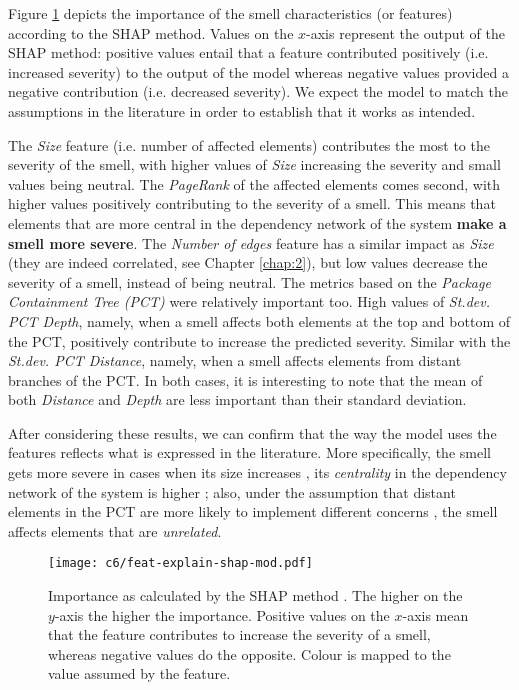 Figure \ref{c6:fig:feat-explain-shap} depicts the importance of the smell characteristics (or features) according to the SHAP method. Values on the $x$-axis represent the output of the SHAP method: positive values entail that a feature contributed positively (i.e. increased severity) to the output of the model whereas negative values provided a negative contribution (i.e. decreased severity).
We expect the model to match the assumptions in the literature in order to establish that it works as intended.

The \emph{Size} feature (i.e. number of affected elements) contributes the most to the severity of the smell, with higher values of \emph{Size} increasing the severity and small values being neutral.
The \emph{PageRank} of the affected elements comes second, with higher values positively contributing to the severity of a smell.
This means that elements that are more central in the dependency network of the system \textbf{make a smell more severe}.
The \emph{Number of edges} feature has a similar impact as \emph{Size} (they are indeed correlated, see Chapter \ref{chap:2}), but low values decrease the severity of a smell, instead of being neutral.
The metrics based on the \emph{Package Containment Tree (PCT)} \cite{Laval2012,AlMutawa2014} were relatively important too.
High values of \emph{St.dev. PCT Depth}, namely, when a smell affects both elements at the top and bottom of the PCT, positively contribute to increase the predicted severity.
Similar with the \emph{St.dev. PCT Distance}, namely, when a smell affects elements from distant branches of the PCT.
In both cases, it is interesting to note that the mean of both \emph{Distance} and \emph{Depth} are less important than their standard deviation.

After considering these results, we can confirm that the way the model uses the features reflects what is expressed in the literature.
More specifically, the smell gets more severe in cases when its size increases \cite{Lippert2006}, its \emph{centrality} in the dependency network of the system is higher \cite{Roveda2018}; also, under the assumption that distant elements in the PCT are more likely to implement different concerns \cite{Laval2012}, the smell affects elements that are  \emph{unrelated}.

\begin{figure}
    \centering
    \texttt{[image: c6/feat-explain-shap-mod.pdf]}
    \caption{Importance as calculated by the SHAP method \cite{Strumbelj2014}. The higher on the $y$-axis the higher the importance.  Positive values on the $x$-axis mean that the feature contributes to increase the severity of a smell, whereas negative values do the opposite. Colour is mapped to the value assumed by the feature.} 
    \label{c6:fig:feat-explain-shap}
\end{figure}


